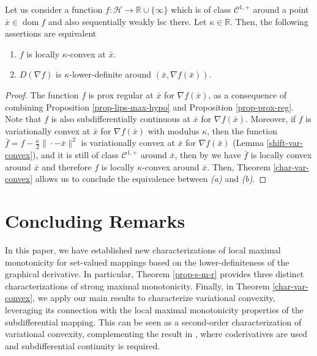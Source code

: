 \documentclass[smallextended,envcountsect,envcountsame]{svjour3}
\renewcommand{\H}{\mathcal{H}}
\newcommand{\R}{\mathbb{R}}
\newcommand{\dom}{\operatorname{dom}}
\newcommand{\1}{\mathds{1}}
\begin{document}
	\begin{corollary}\label{rmk-c11}
		Let us consider a function $f\colon \H\to \R\cup\{\infty\}$ which is of class $\mathcal{C}^{1,+}$ around a point $\bar x\in \dom f$ and also sequentially weakly lsc there. Let $\kappa\in\R$. Then, the following assertions are equivalent
		\begin{enumerate}
			\item [(a)] $f$ is locally $\kappa$-convex at $\bar x$.
			\item [(b)] $D(\nabla f)$ is $\kappa$-lower-definite around $(\bar x,\nabla f(\bar x))$.
		\end{enumerate}
		
	\end{corollary}
	\begin{proof}
		The function $f$ is prox regular at $\bar x$ for $\nabla f(\bar x)$, as a consequence of combining Proposition \ref{prop-lips-max-hypo} and Proposition \ref{prop-prox-reg}. Note that $f$ is also subdifferentially continuous at $\bar x$ for $\nabla f(\bar x)$. Moreover, if $f$ is variationally convex at $\bar x$ for $\nabla f(\bar x)$ with modulus $\kappa$, then the function $\bar f = f - \frac{\kappa}{2}\|\cdot - \bar x\|^2$ is variationally convex at $\bar x$ for $\nabla f(\bar x)$ (Lemma \ref{shift-var-convex}), and it is still of class $\mathcal{C}^{1,+}$ around $\bar x$, then by \cite[Remark 8.15 (iv)]{MR4769808} we have $\bar f$ is locally convex around $\bar x$ and therefore $f$ is locally $\kappa$-convex around $\bar x$. Then, Theorem \ref{char-var-convex} allows us to conclude the equivalence between \emph{(a)} and \emph{(b)}.
	\end{proof}

    \section{Concluding Remarks}
        In this paper, we have established new characterizations of local maximal monotonicity for set-valued mappings based on the lower-definiteness of the graphical derivative. In particular, Theorem \ref{prop-s-m-r} provides three distinct characterizations of strong maximal monotonicity. Finally, in Theorem \ref{char-var-convex}, we apply our main results to characterize variational convexity, leveraging its connection with the local maximal monotonicity properties of the subdifferential mapping. This can be seen as a second-order characterization of variational convexity, complementing the result in \cite[Theorem 7.3]{MR4784083}, where coderivatives are used and subdifferential continuity is required.
        
\end{document}
